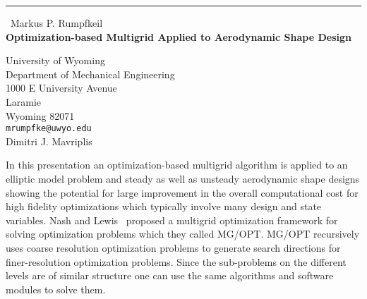\documentclass{report}
\begin{document}
\begin{center}
\rule{6in}{1pt} \
{\large Markus P. Rumpfkeil \\
{\bf Optimization-based Multigrid Applied to Aerodynamic Shape Design}}

University of Wyoming \\ Department of Mechanical Engineering \\ 1000 E University Avenue \\ Laramie \\ Wyoming 82071
\\
{\tt mrumpfke@uwyo.edu}\\
Dimitri J. Mavriplis\end{center}

In this presentation an optimization-based multigrid algorithm is applied
to an elliptic model problem and steady as well as unsteady aerodynamic
shape designs showing
the potential for large improvement in the overall computational cost for
high fidelity optimizations which typically involve many design
and state variables. Nash and Lewis~\cite{Lewis2005} proposed a multigrid
optimization framework for solving optimization problems which they
called MG/OPT.
MG/OPT recursively uses coarse resolution optimization problems to
generate search directions for finer-resolution optimization problems.
Since the sub-problems on the different levels are of similar structure
one can use the same algorithms and software modules to solve them.
\end{document}
